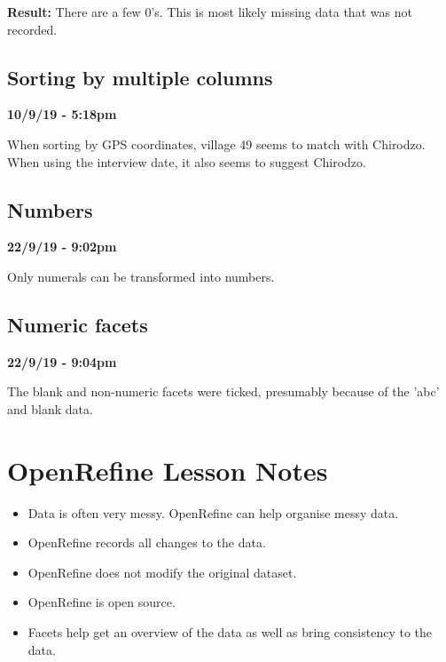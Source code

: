 \documentclass{article}
\begin{document}
\textbf{Result:} There are a few 0's. This is most likely missing data that was not recorded.

\subsection{Sorting by multiple columns}

\textbf{10/9/19 - 5:18pm}

When sorting by GPS coordinates, village 49 seems to match with Chirodzo. When using the interview date, it also seems to suggest Chirodzo.

\subsection{Numbers}

\textbf{22/9/19 - 9:02pm}

Only numerals can be transformed into numbers.

\subsection{Numeric facets}

\textbf{22/9/19 - 9:04pm}

The blank and non-numeric facets were ticked, presumably because of the 'abc' and blank data.

\newpage
\section{OpenRefine Lesson Notes}

\begin{itemize}
    \item Data is often very messy. OpenRefine can help organise messy data.
    \item OpenRefine records all changes to the data.
    \item OpenRefine does not modify the original dataset.
    \item OpenRefine is open source.
    \item Facets help get an overview of the data as well as bring consistency to the data.
\end{itemize}
\end{document}
